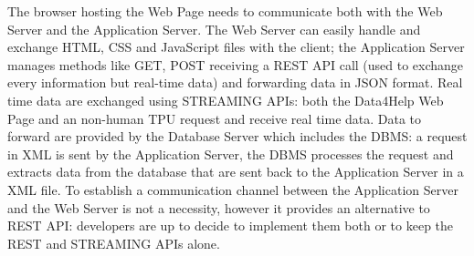 The browser hosting the Web Page needs to communicate both with the Web Server and the Application Server. 
The Web Server can easily handle and exchange HTML, CSS and JavaScript files with the client; the Application Server manages methods like GET, POST receiving a REST API call (used to exchange every information but real-time data) and forwarding data in JSON format. Real time data are exchanged using STREAMING APIs: both the Data4Help Web Page and an non-human TPU request and receive real time data. Data to forward are provided by the Database Server which includes the DBMS: a request in XML is sent by the Application Server, the DBMS processes the request and extracts data from the database that are sent back to the Application Server in a XML file. To establish a communication channel between the Application Server and the Web Server is not a necessity, however it provides an alternative to REST API: developers are up to decide to implement them both or to keep the REST and STREAMING APIs alone. 


